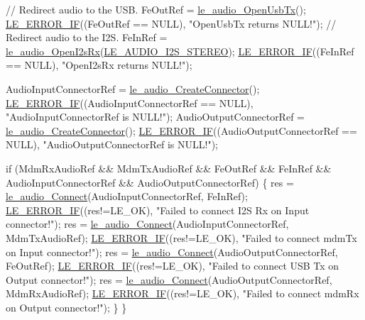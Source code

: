 \begin{DoxyCodeInclude}
{{{{    \textcolor{comment}{// Redirect audio to the USB.}
    FeOutRef = \hyperlink{le__audio__interface_8h_adb38f11ac78cf99160c19f69b4db0eb8}{le\_audio\_OpenUsbTx}();
    \hyperlink{le__log_8h_aceaf11a11691d6c676e36dd317b38dbd}{LE\_ERROR\_IF}((FeOutRef == NULL), \textcolor{stringliteral}{"OpenUsbTx returns NULL!"});
    \textcolor{comment}{// Redirect audio to the I2S.}
    FeInRef = \hyperlink{le__audio__interface_8h_a9e7d0042c4f422554eb10d64535608e5}{le\_audio\_OpenI2sRx}(\hyperlink{le__audio__interface_8h_a94794180ed71a84bd26a1f525858f252a6ce77f5f956b203e15f662900a5103dd}{LE\_AUDIO\_I2S\_STEREO});
    \hyperlink{le__log_8h_aceaf11a11691d6c676e36dd317b38dbd}{LE\_ERROR\_IF}((FeInRef == NULL), \textcolor{stringliteral}{"OpenI2sRx returns NULL!"});

    AudioInputConnectorRef = \hyperlink{le__audio__interface_8h_a570aaf85086f00aca592acfbaaa237be}{le\_audio\_CreateConnector}();
    \hyperlink{le__log_8h_aceaf11a11691d6c676e36dd317b38dbd}{LE\_ERROR\_IF}((AudioInputConnectorRef == NULL), \textcolor{stringliteral}{"AudioInputConnectorRef is NULL!"});
    AudioOutputConnectorRef = \hyperlink{le__audio__interface_8h_a570aaf85086f00aca592acfbaaa237be}{le\_audio\_CreateConnector}();
    \hyperlink{le__log_8h_aceaf11a11691d6c676e36dd317b38dbd}{LE\_ERROR\_IF}((AudioOutputConnectorRef == NULL), \textcolor{stringliteral}{"AudioOutputConnectorRef is NULL!"});

    \textcolor{keywordflow}{if} (MdmRxAudioRef && MdmTxAudioRef && FeOutRef && FeInRef &&
        AudioInputConnectorRef && AudioOutputConnectorRef)
    \{
        res = \hyperlink{le__audio__interface_8h_a338df65b2fb1ae0140d86880adbcf0de}{le\_audio\_Connect}(AudioInputConnectorRef, FeInRef);
        \hyperlink{le__log_8h_aceaf11a11691d6c676e36dd317b38dbd}{LE\_ERROR\_IF}((res!=LE\_OK), \textcolor{stringliteral}{"Failed to connect I2S Rx on Input connector!"});
        res = \hyperlink{le__audio__interface_8h_a338df65b2fb1ae0140d86880adbcf0de}{le\_audio\_Connect}(AudioInputConnectorRef, MdmTxAudioRef);
        \hyperlink{le__log_8h_aceaf11a11691d6c676e36dd317b38dbd}{LE\_ERROR\_IF}((res!=LE\_OK), \textcolor{stringliteral}{"Failed to connect mdmTx on Input connector!"});
        res = \hyperlink{le__audio__interface_8h_a338df65b2fb1ae0140d86880adbcf0de}{le\_audio\_Connect}(AudioOutputConnectorRef, FeOutRef);
        \hyperlink{le__log_8h_aceaf11a11691d6c676e36dd317b38dbd}{LE\_ERROR\_IF}((res!=LE\_OK), \textcolor{stringliteral}{"Failed to connect USB Tx on Output connector!"});
        res = \hyperlink{le__audio__interface_8h_a338df65b2fb1ae0140d86880adbcf0de}{le\_audio\_Connect}(AudioOutputConnectorRef, MdmRxAudioRef);
        \hyperlink{le__log_8h_aceaf11a11691d6c676e36dd317b38dbd}{LE\_ERROR\_IF}((res!=LE\_OK), \textcolor{stringliteral}{"Failed to connect mdmRx on Output connector!"});
    \}
\}

}}}}
\end{DoxyCodeInclude}
